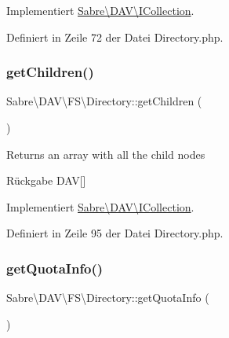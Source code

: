 Implementiert \mbox{\hyperlink{interface_sabre_1_1_d_a_v_1_1_i_collection_a09f82b07550611752abb149f468b89c2}{Sabre\textbackslash{}\+D\+A\+V\textbackslash{}\+I\+Collection}}.



Definiert in Zeile 72 der Datei Directory.\+php.

\mbox{\label{class_sabre_1_1_d_a_v_1_1_f_s_1_1_directory_ab955171be88f9c130fd8d71f5d271aab}} 
\subsubsection{\texorpdfstring{get\+Children()}{getChildren()}}
{\footnotesize\ttfamily Sabre\textbackslash{}\+D\+A\+V\textbackslash{}\+F\+S\textbackslash{}\+Directory\+::get\+Children (\begin{DoxyParamCaption}{ }\end{DoxyParamCaption})}

Returns an array with all the child nodes

\begin{DoxyReturn}{Rückgabe}
D\+AV\mbox{[}\mbox{]} 
\end{DoxyReturn}


Implementiert \mbox{\hyperlink{interface_sabre_1_1_d_a_v_1_1_i_collection_a5344a6890e49fd7a81bb0e38b4c6d0be}{Sabre\textbackslash{}\+D\+A\+V\textbackslash{}\+I\+Collection}}.



Definiert in Zeile 95 der Datei Directory.\+php.

\mbox{\label{class_sabre_1_1_d_a_v_1_1_f_s_1_1_directory_aea57550df5c833e8c056451f364ea2de}} 
\subsubsection{\texorpdfstring{get\+Quota\+Info()}{getQuotaInfo()}}
{\footnotesize\ttfamily Sabre\textbackslash{}\+D\+A\+V\textbackslash{}\+F\+S\textbackslash{}\+Directory\+::get\+Quota\+Info (\begin{DoxyParamCaption}{ }\end{DoxyParamCaption})}

